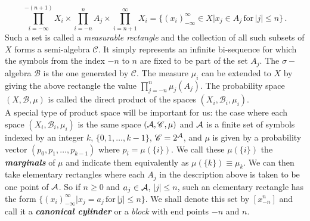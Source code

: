 \begin{equation} 
\label{eq:product_space}
    \prod_{i=-\infty}^{-(n+1)} X_i \times \prod_{i=-n}^{n} A_j \times \prod_{i=n+1}^{\infty} X_i = \big\{ (x_i)_{-\infty}^{\infty} \in X \big| x_j \in A_j \, \text{for} \, |j| \leq n \big\} \, .
\end{equation}
Such a set is called a \textit{measurable rectangle} and the collection of all such subsets of $X$ forms a semi-algebra $\mathscr{C}$. It simply represents an infinite bi-sequence for which the symbols from the index $-n$ to $n$ are fixed to be part of the set $A_j$. The $\sigma-$algebra $\mathscr{B}$ is the one generated by $\mathscr{C}$. The measure $\mu_i$ can be extended to $X$ by giving the above rectangle the value $\prod_{j=-n}^{n} \mu_j(A_j)$. The probability space $(X, \mathscr{B}, \mu)$ is called the direct product of the spaces $(X_i, \mathscr{B}_i, \mu_i)$. 
\\A special type of product space will be important for us: the case where each space $(X_i, \mathscr{B}_i, \mu_i)$ is the same space $(\mathcal{A}, \mathscr{C}, \mu)$ and $\mathcal{A}$ is a finite set of symbols indexed by an integer $k$, $\{ 0, 1, \dots, k-1 \}$, $\mathscr{C} = 2^{\mathcal{A}}$, and $\mu$ is given by a probability vector $(p_0,p_1, \dots, p_{k-1})$ where $p_i = \mu(\{i\})$. We call these $\mu(\{i\})$ the \textit{\textbf{marginals}} of $\mu$ and indicate them equivalently as  $\mu(\{k\}) \equiv \mu_k$. We can then take elementary rectangles where each $A_j$ in the description above is taken to be one point of $\mathcal{A}$. So if $n \geq 0$ and $a_j \in \mathcal{A}$, $|j| \leq n$, such an elementary rectangle has the form $\{ (x_i)_{-\infty}^{\infty} \big| x_j = a_j \, \text{for} \, |j| \leq n\}$. We shall denote this set by $[x_{-n}^n]$ and call it a \textit{\textbf{canonical cylinder}} or a \textit{block} with end points $-n$ and $n$. 

